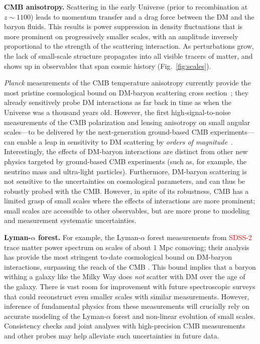 \documentclass[12pt]{article}
\newcommand{\vg}[1] {\textcolor{red}{#1}}
\begin{document}
\textbf{CMB anisotropy.} 
Scattering in the early Universe (prior to recombination at $z\sim 1100$) leads to momentum transfer and a drag force between the DM and the baryon fluids.
This results is power suppression in density fluctuations that is more prominent on progressively smaller scales, with an amplitude inversely proportional to the strength of the scattering interaction.
As perturbations grow, the lack of small-scale structure propagates into all visible tracers of matter, and shows up in observables that span cosmic history (Fig.~\ref{fig:scales}).

\textit{Planck} measurements of the CMB temperature anisotropy currently provide the most pristine cosmological bound on DM-baryon scattering cross section~\cite{Boddy:2018kfv,Gluscevic:2017ywp,Boddy:2018wzy,Xu:2018efh,Slatyer:2018aqg,Dvorkin:2013cea}; they already sensitively probe DM interactions as far back in time as when the Universe was a thousand years old.
However, the first high-signal-to-noise measurements of the CMB polarization and lensing anisotropy on small angular scales---to be delivered by the next-generation ground-based CMB experiments---can enable a leap in sensitivity to DM scattering by \textit{orders of magnitude}~\cite{Li:2018zdm,2018arXiv180807445T,Abazajian:2016yjj}.
Interestingly, the effects of DM-baryon interactions are distinct from other new physics targeted by ground-based CMB experiments (such as, for example, the neutrino mass and ultra-light particles).
Furthermore, DM-baryon scattering is not sensitive to the uncertainties on cosmological parameters, and can thus be robustly probed with the CMB.
However, in spite of its robustness, CMB has a limited grasp of small scales where the effects of interactions are more prominent; small scales are accessible to other observables, but are more prone to modeling and measurement systematic uncertainties.

\textbf{Lyman-$\alpha$ forest.} 
For example, the Lyman-$\alpha$ forest measurements from \vg{SDSS-2} trace matter power spectrum on scales of about 1 Mpc comoving; their analysis has provide the most stringent to-date cosmological bound on DM-baryon interactions, surpassing the reach of the CMB  \cite{Dvorkin:2013cga,Slatyer:2018aqg,Xu:2018efh}.
This bound implies that a baryon withing a galaxy like the Milky Way does \textit{not} scatter with DM over the age of the galaxy.
There is vast room for improvement with future spectroscopic surveys that could reconstruct even smaller scales with similar measurements.
However, inference of fundamental physics from these measurements will crucially rely on accurate modeling of the Lyman-$\alpha$ forest and non-linear evolution of small scales.
Consistency checks and joint analyses with high-precision CMB measurements and other probes may help alleviate such uncertainties in future data.
\end{document}

